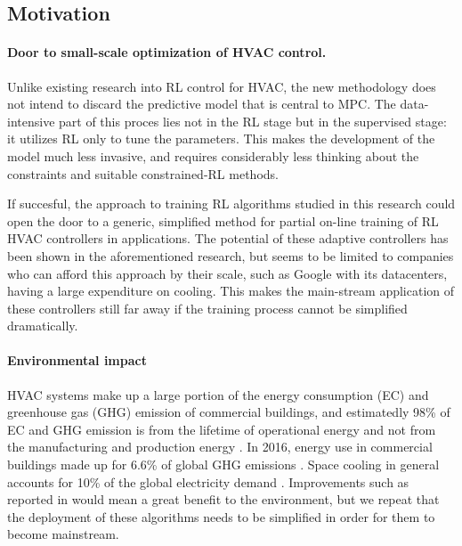 \documentclass{article}
\theoremstyle{definition}
\theoremstyle{remark}
\begin{document}
\subsection{Motivation} \label{motivation}
\paragraph{Door to small-scale optimization of HVAC control.}
Unlike existing research into RL control for HVAC, the new methodology does not intend to discard the predictive model that is central to MPC. The data-intensive part of this proces lies not in the RL stage but in the supervised stage: it utilizes RL only to tune the parameters. This makes the development of the model much less invasive, and requires considerably less thinking about the constraints and suitable constrained-RL methods. 

If succesful, the approach to training RL algorithms studied in this research could open the door to a generic, simplified method for partial on-line training of RL HVAC controllers in applications. The potential of these adaptive controllers has been shown in the aforementioned research, but seems to be limited to companies who can afford this approach by their scale, such as Google with its datacenters, having a large expenditure on cooling. This makes the main-stream application of these controllers still far away if the training process cannot be simplified dramatically.

\paragraph{Environmental impact}
HVAC systems make up a large portion of the energy consumption (EC) and greenhouse gas (GHG) emission of commercial buildings, and estimatedly 98\% of EC and GHG emission is from the lifetime of operational energy and not from the manufacturing and production energy \cite{co2emissionsfromhvacequipment,COLE1998335,SUZUKI199833,lifecycleenergyanalysis}. In 2016, energy use in commercial buildings made up for 6.6\% of global GHG emissions \cite{owidco2andgreenhousegasemissions}. Space cooling in general accounts for 10\% of the global electricity demand \cite{futureofcooling}. Improvements such as reported in \cite{evans_gao_2016} would mean a great benefit to the environment, but we repeat that the deployment of these algorithms needs to be simplified in order for them to become mainstream.
\end{document}
